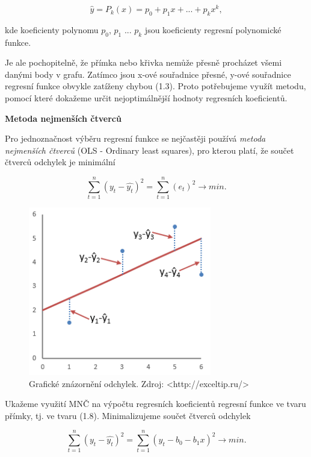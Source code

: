 \documentclass[a4paper,12pt,twoside]{scrreprt}
\begin{document}
\begin{equation}
\hat{y} = P_k(x) = p_0 + p_1x + ... + p_kx^k,
\end{equation} 

kde koeficienty polynomu $p_0$, $p_1$ ... $p_k$ jsou koeficienty regresní polynomické funkce. 

Je ale pochopitelně, že přímka nebo křivka nemůže přesně procházet všemi danými body v grafu. Zatímco jsou x-ové souřadnice přesné, y-ové souřadnice regresní funkce obvykle zatíženy chybou (1.3). Proto potřebujeme využít metodu, pomocí které dokažeme určit nejoptimálnější hodnoty regresních koeficientů. 

\normalsize\textbf{\newline Metoda nejmenších čtverců}

Pro jednoznačnost výběru regresní funkce se nejčastěji používá \textit{metoda nejmenších čtverců} (OLS - Ordinary least squares), pro kterou platí, že součet čtverců odchylek je minimální

\begin{equation}
\sum_{t=1}^{n}(y_t - \hat{y_t})^2 = \sum_{t=1}^{n}(e_t)^2 \rightarrow min. 
\end{equation}

\begin{figure}[h]
  \centering
  \includegraphics[width=8cm]{pictures/odchylky.png}
  \caption{Grafické znázornění odchylek. Zdroj: <http://exceltip.ru/>}
  \label{fig:odchylky}
\end{figure}

Ukažeme využití MNČ na výpočtu regresních koeficientů regresní funkce ve tvaru přímky, tj. ve tvaru (1.8). Minimalizujeme součet čtverců odchylek 

\begin{equation}
\sum_{t=1}^{n}(y_t - \hat{y_t})^2 = \sum_{t=1}^{n}(y_t - b_0 - b_1x)^2 \rightarrow min. 
\end{equation}
\end{document}
